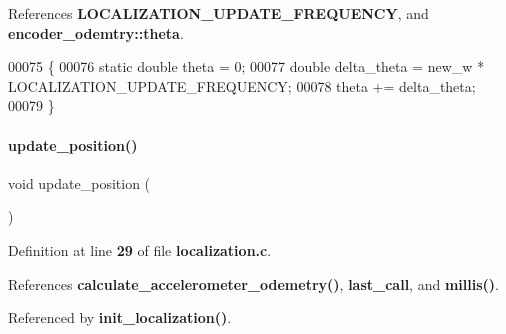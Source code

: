 References \textbf{ L\+O\+C\+A\+L\+I\+Z\+A\+T\+I\+O\+N\+\_\+\+U\+P\+D\+A\+T\+E\+\_\+\+F\+R\+E\+Q\+U\+E\+N\+CY}, and \textbf{ encoder\+\_\+odemtry\+::theta}.


\begin{DoxyCode}
00075                                           \{
00076   \textcolor{keyword}{static} \textcolor{keywordtype}{double} theta = 0;
00077   \textcolor{keywordtype}{double} delta\_theta = new\_w * LOCALIZATION_UPDATE_FREQUENCY;
00078   theta += delta\_theta;
00079 \}
\end{DoxyCode}
\mbox{\label{localization_8c_afacd5e0b3d5e677df26a4402bbd9ec9e}} 
\paragraph{update\+\_\+position()}
{\footnotesize\ttfamily void update\+\_\+position (\begin{DoxyParamCaption}{ }\end{DoxyParamCaption})}



Definition at line \textbf{ 29} of file \textbf{ localization.\+c}.



References \textbf{ calculate\+\_\+accelerometer\+\_\+odemetry()}, \textbf{ last\+\_\+call}, and \textbf{ millis()}.



Referenced by \textbf{ init\+\_\+localization()}.



